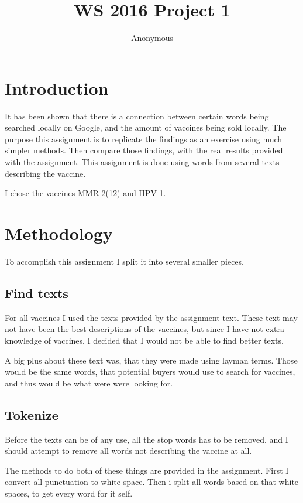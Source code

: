 \documentclass{sig-alternate}
\begin{document}
\title{WS 2016 Project 1}
\author{
\alignauthor 
Anonymous
}
\maketitle



\section{Introduction}
It has been shown that there is a connection between certain words being searched locally  on Google, and the amount of vaccines being sold locally\cite{H2016}. The purpose this assignment is to replicate the findings as an exercise using much simpler methods. Then compare those findings, with the real results provided with the assignment. This assignment is done using words from several texts describing the vaccine. 

I chose the vaccines MMR-2(12) and HPV-1.

\section{Methodology}
To accomplish this assignment I split it into several smaller pieces. 
\subsection*{Find texts}
For all vaccines I used the texts provided by the assignment text. These text may not have been the best descriptions of the vaccines, but since I have not extra knowledge of vaccines, I decided that I would not be able to find better texts. 

A big plus about these text was, that they were made using layman terms. Those would be the same words, that potential buyers would use to search for vaccines, and thus would be what were were looking for.

\subsection*{Tokenize}
Before the texts can be of any use, all the stop words has to be removed, and I should attempt to remove all words not describing the vaccine at all. 

The methods to do both of these things are provided in the assignment. First I convert all punctuation to white space. Then i split all words based on that white spaces, to get every word for it self.
\end{document}
